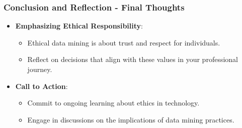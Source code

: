 \documentclass[aspectratio=169]{beamer}
\begin{document}
\begin{frame}[fragile]
  \frametitle{Conclusion and Reflection - Final Thoughts}
  \begin{itemize}
    \item \textbf{Emphasizing Ethical Responsibility}:
      \begin{itemize}
        \item Ethical data mining is about trust and respect for individuals.
        \item Reflect on decisions that align with these values in your professional journey.
      \end{itemize}

    \item \textbf{Call to Action}:
      \begin{itemize}
        \item Commit to ongoing learning about ethics in technology.
        \item Engage in discussions on the implications of data mining practices.
      \end{itemize}
  \end{itemize}
\end{frame}
\end{document}
